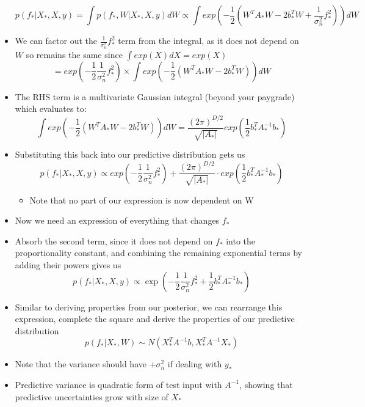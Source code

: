 \documentclass[12pt]{article}
\begin{document}
\begin{itemize}
\begin{equation}
    p(f_*|X_*,X,y) = \int p(f_*,W|X_*,X,y)dW \propto \int exp\left(-\frac{1}{2}\left(W^TA_*W - 2b_*^TW + \frac{1}{\sigma_n^2}f_*^2\right)\right)dW
\end{equation}
    \item We can factor out the $\frac{1}{\sigma_n^2}f_*^2$ term from the integral, as it does not depend on $W$ so remains the same since $\int exp(X) dX = exp(X)$ 
\begin{equation}
    = exp\left(-\frac{1}{2}\frac{1}{\sigma_n^2}f_*^2\right) \times \int exp\left(-\frac{1}{2}\left(W^TA_*W - 2b_*^TW\right)\right) dW
\end{equation}
    \item The RHS term is a multivariate Gaussian integral (beyond your paygrade) which evaluates to:
\begin{equation}
    \int exp\left(-\frac{1}{2} \left( W^TA_*W - 2b_*^TW \right) \right) dW = \frac{(2\pi)^{D/2}} {\sqrt{|A_*|}} exp\left( \frac{1}{2} b_*^TA_*^{-1}b_* \right)
\end{equation}
    \item Substituting this back into our predictive distribution gets us
\begin{equation}
    p(f_*|X_*,X,y) \propto exp\left(-\frac{1}{2}\frac{1}{\sigma_n^2}f_*^2\right) + \frac{(2\pi)^{D/2}}{\sqrt{|A_*|}} \cdot exp\left(\frac{1}{2}b_*^TA_*^{-1}b_*\right)  
\end{equation}
    \begin{itemize}
        \item Note that no part of our expression is now dependent on W
    \end{itemize}
    \item Now we need an expression of everything that changes $f_*$
    \item Absorb the second term, since it does not depend on $f_*$ into the proportionality constant, and combining the remaining exponential terms by adding their powers gives us
\begin{equation}
    p(f_*|X_*,X,y) \propto \exp\left(-\frac{1}{2}\frac{1}{\sigma_n^2}f_*^2 + \frac{1}{2}b_*^TA_*^{-1}b_*\right)
\end{equation}
    \item Similar to deriving properties from our posterior, we can rearrange this expression, complete the square and derive the properties of our predictive distribution
\begin{equation}
    p(f_*|X_*,W) \sim N(X_*^TA^{-1}b, X_*^TA^{-1}X_*)
\end{equation}
    \item Note that the variance should have $+ \sigma_n^2$ if dealing with $y_*$
    \item Predictive variance is quadratic form of test input with $A^{-1}$, showing that predictive uncertainties grow with size of $X_*$
\end{itemize}
\end{document}
